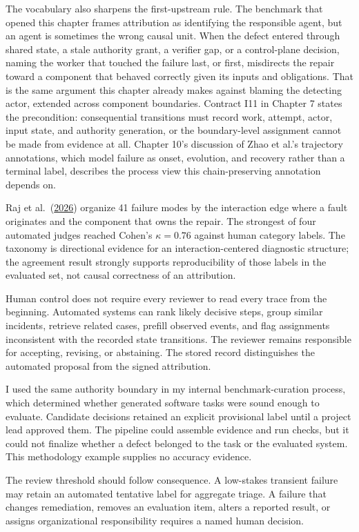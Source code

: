 The vocabulary also sharpens the first-upstream rule. The benchmark that opened this chapter frames attribution as identifying the responsible agent, but an agent is sometimes the wrong causal unit. When the defect entered through shared state, a stale authority grant, a verifier gap, or a control-plane decision, naming the worker that touched the failure last, or first, misdirects the repair toward a component that behaved correctly given its inputs and obligations. That is the same argument this chapter already makes against blaming the detecting actor, extended across component boundaries. Contract I11 in Chapter 7 states the precondition: consequential transitions must record work, attempt, actor, input state, and authority generation, or the boundary-level assignment cannot be made from evidence at all. Chapter 10's discussion of Zhao et al.'s trajectory annotations, which model failure as onset, evolution, and recovery rather than a terminal label, describes the process view this chain-preserving annotation depends on.

Raj et al.~(\href{https://arxiv.org/abs/2607.28802}{2026}) organize 41 failure modes by the interaction edge where a fault originates and the component that owns the repair. The strongest of four automated judges reached Cohen's \(\kappa=0.76\) against human category labels. The taxonomy is directional evidence for an interaction-centered diagnostic structure; the agreement result strongly supports reproducibility of those labels in the evaluated set, not causal correctness of an attribution.

Human control does not require every reviewer to read every trace from the beginning. Automated systems can rank likely decisive steps, group similar incidents, retrieve related cases, prefill observed events, and flag assignments inconsistent with the recorded state transitions. The reviewer remains responsible for accepting, revising, or abstaining. The stored record distinguishes the automated proposal from the signed attribution.

I used the same authority boundary in my internal benchmark-curation process, which determined whether generated software tasks were sound enough to evaluate. Candidate decisions retained an explicit provisional label until a project lead approved them. The pipeline could assemble evidence and run checks, but it could not finalize whether a defect belonged to the task or the evaluated system. This methodology example supplies no accuracy evidence.

The review threshold should follow consequence. A low-stakes transient failure may retain an automated tentative label for aggregate triage. A failure that changes remediation, removes an evaluation item, alters a reported result, or assigns organizational responsibility requires a named human decision.

